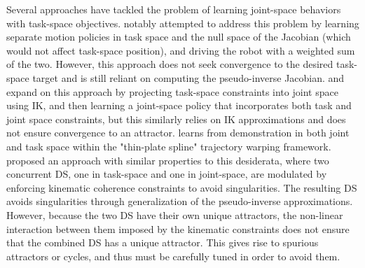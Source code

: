 \documentclass[letterpaper, 10 pt, conference,fleqn]{ieeeconf}
\begin{document}
Several approaches have tackled the problem of learning joint-space behaviors with task-space objectives. \cite{calinon2008probabilistic} notably attempted to address this problem by learning separate motion policies in task space and the null space of the Jacobian (which would not affect task-space position), and driving the robot with a weighted sum of the two.  However, this approach does not seek convergence to the desired task-space target and is still reliant on computing the pseudo-inverse Jacobian. \cite{calinon2010learning} and \cite{silverio2017learning} expand on this approach by projecting task-space constraints into joint space using IK, and then learning a joint-space policy that incorporates both task and joint space constraints, but this similarly relies on IK approximations and does not ensure convergence to an attractor.
\cite{lee2014unifying} learns from demonstration in both joint and task space within the "thin-plate spline" trajectory warping framework. %
\cite{hersch2008reaching} proposed an approach with similar properties to this desiderata, where two concurrent DS, one in task-space and one in joint-space, are modulated by enforcing kinematic coherence constraints to avoid singularities. The resulting DS avoids singularities through generalization of the pseudo-inverse approximations. However, because the two DS have their own unique attractors, the non-linear interaction between them imposed by the kinematic constraints does not ensure that the combined DS has a unique attractor. This gives rise to spurious attractors or cycles, and thus must be carefully tuned in order to avoid them. 
\end{document}
